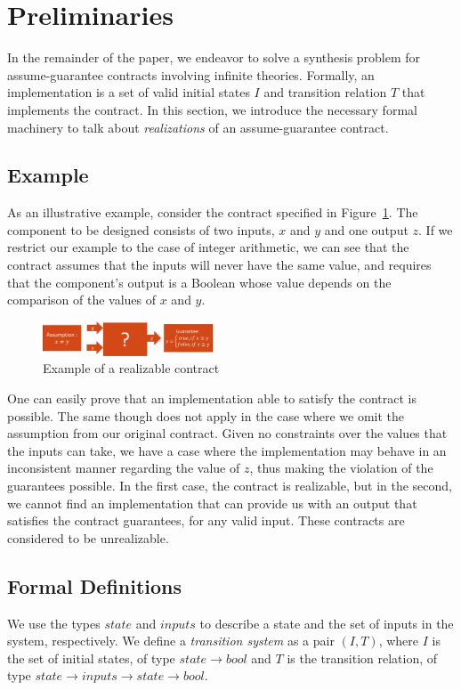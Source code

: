 \section{Preliminaries}
\label{sec:preliminaries}

In the remainder of the paper, we endeavor to solve a synthesis problem for
assume-guarantee contracts involving infinite theories.  Formally, an
implementation is a set of valid initial states $I$ and transition relation $T$ that implements the contract.  In this section, we introduce the necessary formal machinery to talk about {\em realizations} of an assume-guarantee contract.

\subsection{Example}
As an illustrative example, consider the contract specified in
Figure~\ref{fg:example}. The component to be designed consists of two
inputs, $x$ and $y$ and one output $z$. If we restrict our example to the case
of integer arithmetic, we can see that the contract assumes that the inputs will
never have the same value, and requires that the component's output is a Boolean
whose value depends on the comparison of the values of $x$ and $y$.

\begin{figure}[H]
	\centering
	\includegraphics[width=0.45\textwidth,height=\textheight,keepaspectratio]{real1-crop}    	
	\caption{Example of a realizable contract}
	\label{fg:example}
\end{figure}


One can easily prove that an implementation able to satisfy the contract is
possible. The same though does not apply in the case where we omit the
assumption from our original contract. Given no constraints over the values that the inputs can take, we have a case where the implementation may
behave in an inconsistent manner regarding the value of $z$, thus making the
violation of the guarantees possible. In the first case, the contract is realizable, but in the second, we
cannot find an implementation that can provide us with an output that satisfies
the contract guarantees, for any valid input. These contracts are considered to
be unrealizable.

\subsection{Formal Definitions}
We use the types $state$ and $inputs$ to describe a state
and the set of inputs in the system, respectively. We define a
\textit{transition system} as a pair $(I,T)$, where $I$ is the set of initial states, of type $state \rightarrow
bool$ and $T$ is the transition relation, of type $state \rightarrow inputs
\rightarrow state \rightarrow bool$. 

